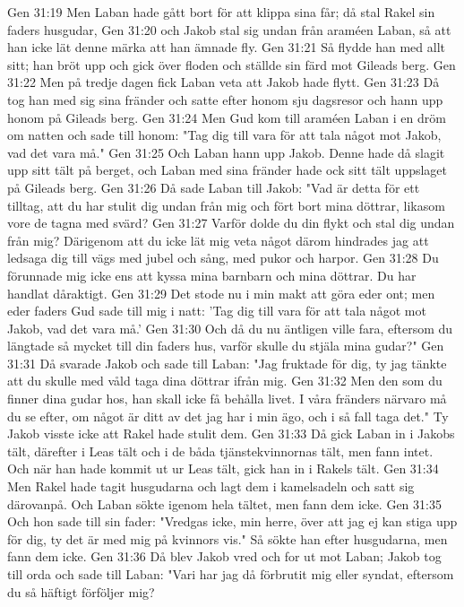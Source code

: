 Gen 31:19  Men Laban hade gått bort för att klippa sina får; då stal Rakel sin faders husgudar,
Gen 31:20  och Jakob stal sig undan från araméen Laban, så att han icke lät denne märka att han ämnade fly.
Gen 31:21  Så flydde han med allt sitt; han bröt upp och gick över floden och ställde sin färd mot Gileads berg.
Gen 31:22  Men på tredje dagen fick Laban veta att Jakob hade flytt.
Gen 31:23  Då tog han med sig sina fränder och satte efter honom sju dagsresor och hann upp honom på Gileads berg.
Gen 31:24  Men Gud kom till araméen Laban i en dröm om natten och sade till honom: "Tag dig till vara för att tala något mot Jakob, vad det vara må."
Gen 31:25  Och Laban hann upp Jakob. Denne hade då slagit upp sitt tält på berget, och Laban med sina fränder hade ock sitt tält uppslaget på Gileads berg.
Gen 31:26  Då sade Laban till Jakob: "Vad är detta för ett tilltag, att du har stulit dig undan från mig och fört bort mina döttrar, likasom vore de tagna med svärd?
Gen 31:27  Varför dolde du din flykt och stal dig undan från mig? Därigenom att du icke lät mig veta något därom hindrades jag att ledsaga dig till vägs med jubel och sång, med pukor och harpor.
Gen 31:28  Du förunnade mig icke ens att kyssa mina barnbarn och mina döttrar. Du har handlat dåraktigt.
Gen 31:29  Det stode nu i min makt att göra eder ont; men eder faders Gud sade till mig i natt: 'Tag dig till vara för att tala något mot Jakob, vad det vara må.'
Gen 31:30  Och då du nu äntligen ville fara, eftersom du längtade så mycket till din faders hus, varför skulle du stjäla mina gudar?"
Gen 31:31  Då svarade Jakob och sade till Laban: "Jag fruktade för dig, ty jag tänkte att du skulle med våld taga dina döttrar ifrån mig.
Gen 31:32  Men den som du finner dina gudar hos, han skall icke få behålla livet. I våra fränders närvaro må du se efter, om något är ditt av det jag har i min ägo, och i så fall taga det." Ty Jakob visste icke att Rakel hade stulit dem.
Gen 31:33  Då gick Laban in i Jakobs tält, därefter i Leas tält och i de båda tjänstekvinnornas tält, men fann intet. Och när han hade kommit ut ur Leas tält, gick han in i Rakels tält.
Gen 31:34  Men Rakel hade tagit husgudarna och lagt dem i kamelsadeln och satt sig därovanpå. Och Laban sökte igenom hela tältet, men fann dem icke.
Gen 31:35  Och hon sade till sin fader: "Vredgas icke, min herre, över att jag ej kan stiga upp för dig, ty det är med mig på kvinnors vis." Så sökte han efter husgudarna, men fann dem icke.
Gen 31:36  Då blev Jakob vred och for ut mot Laban; Jakob tog till orda och sade till Laban: "Vari har jag då förbrutit mig eller syndat, eftersom du så häftigt förföljer mig?
